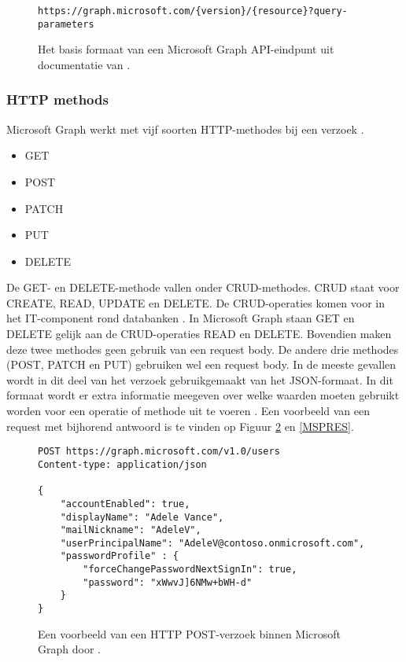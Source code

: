 \begin{figure}[h!]
    \scriptsize
    \begin{verbatim}
https://graph.microsoft.com/{version}/{resource}?query-parameters
    \end{verbatim}    
    \caption[Basis formaat Microsoft Graph API-eindpunt]{Het basis formaat van een Microsoft Graph \Ac{API}-eindpunt uit documentatie van \textcite{Microsoft2023o}.}
    \label{RAM}
\end{figure}


\subsubsection{HTTP methods}


Microsoft Graph werkt met vijf soorten \Ac{HTTP}-methodes bij een verzoek \autocite{Microsoft2023vv}.

\begin{itemize}
    \item GET
    \item POST
    \item PATCH
    \item PUT
    \item DELETE
\end{itemize}

De GET- en DELETE-methode vallen onder CRUD-methodes. CRUD staat voor CREATE, READ, UPDATE en DELETE. De CRUD-operaties komen voor in het \ac{IT}-component rond databanken \autocite{Truica2015}. In Microsoft Graph staan GET en DELETE gelijk aan de CRUD-operaties READ en DELETE. Bovendien maken deze twee methodes geen gebruik van een request body. De andere drie methodes (POST, PATCH en PUT) gebruiken wel een request body. In de meeste gevallen wordt in dit deel van het verzoek gebruikgemaakt van het \ac{JSON}-formaat. In dit formaat wordt er extra informatie meegeven over welke waarden moeten gebruikt worden voor een operatie of methode uit te voeren \autocite{Microsoft2023vv}. Een voorbeeld van een request met bijhorend antwoord is te vinden op Figuur \ref{MSPR} en \ref{MSPRES}. \\

\begin{figure}[h]
    \scriptsize
    \begin{verbatim}
POST https://graph.microsoft.com/v1.0/users
Content-type: application/json

{
    "accountEnabled": true,
    "displayName": "Adele Vance",
    "mailNickname": "AdeleV",
    "userPrincipalName": "AdeleV@contoso.onmicrosoft.com",
    "passwordProfile" : {
        "forceChangePasswordNextSignIn": true,
        "password": "xWwvJ]6NMw+bWH-d"
    }
}
    \end{verbatim}    
    \caption[Voorbeeld Microsoft Graph POST-verzoek]{Een voorbeeld van een \ac{HTTP} POST-verzoek binnen Microsoft Graph door \textcite{Microsoft2022e}.}
    \label{MSPR}
\end{figure}

